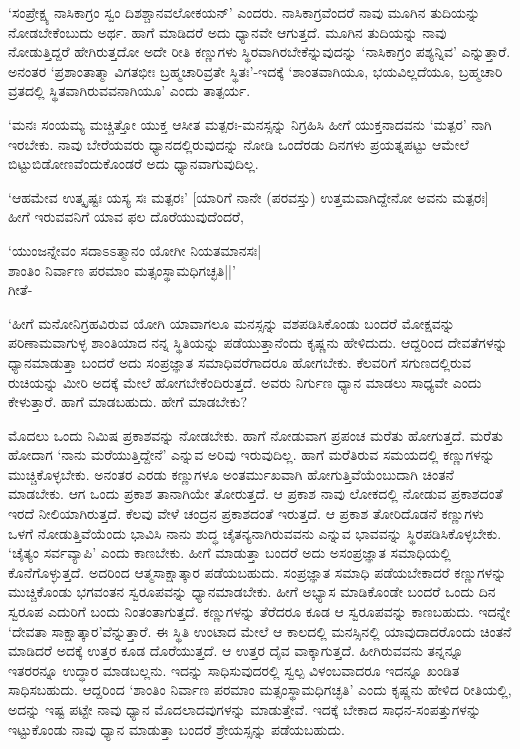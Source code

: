 `ಸಂಪ್ರೇಕ್ಷ್ಯ ನಾಸಿಕಾಗ್ರಂ ಸ್ವಂ ದಿಶಶ್ಚಾನವಲೋಕಯನ್' ಎಂದರು. ನಾಸಿಕಾಗ್ರವೆಂದರೆ ನಾವು ಮೂಗಿನ ತುದಿಯನ್ನು ನೋಡಬೇಕೆಂಬುದು ಅರ್ಥ. ಹಾಗೆ ಮಾಡಿದರೆ ಅದು ಧ್ಯಾನವೇ ಆಗುತ್ತದೆ. ಮೂಗಿನ ತುದಿಯನ್ನು ನಾವು ನೋಡುತ್ತಿದ್ದರೆ ಹೇಗಿರುತ್ತದೋ ಅದೇ ರೀತಿ ಕಣ್ಣುಗಳು ಸ್ಥಿರವಾಗಿರಬೇಕೆನ್ನುವುದನ್ನು `ನಾಸಿಕಾಗ್ರಂ ಪಶ್ಯನ್ನಿವ' ಎನ್ನುತ್ತಾರೆ. ಅನಂತರ `ಪ್ರಶಾಂತಾತ್ಮಾ ವಿಗತಭೀಃ ಬ್ರಹ್ಮಚಾರಿವ್ರತೇ ಸ್ಥಿತಃ'-ಇದಕ್ಕೆ `ಶಾಂತವಾಗಿಯೂ, ಭಯವಿಲ್ಲದೆಯೂ, ಬ್ರಹ್ಮಚಾರಿ ವ್ರತದಲ್ಲಿ ಸ್ಥಿತವಾಗಿರುವವನಾಗಿಯೂ' ಎಂದು ತಾತ್ಪರ್ಯ.

`ಮನಃ ಸಂಯಮ್ಯ ಮಚ್ಚಿತ್ತೋ ಯುಕ್ತ ಆಸೀತ ಮತ್ಪರಃ-ಮನಸ್ಸನ್ನು ನಿಗ್ರಹಿಸಿ ಹೀಗೆ ಯುಕ್ತನಾದವನು `ಮತ್ಪರ' ನಾಗಿ ಇರಬೇಕು. ನಾವು ಬೇರೆಯವರು ಧ್ಯಾನದಲ್ಲಿರುವುದನ್ನು ನೋಡಿ ಒಂದೆರಡು ದಿನಗಳು ಪ್ರಯತ್ನಪಟ್ಟು ಆಮೇಲೆ ಬಿಟ್ಟುಬಿಡೋಣವೆಂದುಕೊಂಡರೆ ಅದು ಧ್ಯಾನವಾಗುವುದಿಲ್ಲ.

`ಆಹಮೇವ ಉತ್ಕೃಷ್ಟಃ ಯಸ್ಯ ಸಃ ಮತ್ಪರಃ' [ಯಾರಿಗೆ ನಾನೇ (ಪರವಸ್ತು) ಉತ್ತಮವಾಗಿದ್ದೇನೋ ಅವನು ಮತ್ಪರಃ] ಹೀಗೆ ಇರುವವನಿಗೆ ಯಾವ ಫಲ ದೊರೆಯುವುದೆಂದರೆ,

\begin{shloka}
`ಯುಂಜನ್ನೇವಂ ಸದಾಽಽತ್ಮಾನಂ ಯೋಗೀ ನಿಯತಮಾನಸಃ|\\
ಶಾಂತಿಂ ನಿರ್ವಾಣ ಪರಮಾಂ ಮತ್ಸಂಸ್ಥಾಮಧಿಗಚ್ಛತಿ||'\\
\hfill{ಗೀತೆ-}
\end{shloka}

`ಹೀಗೆ ಮನೋನಿಗ್ರಹವಿರುವ ಯೋಗಿ ಯಾವಾಗಲೂ ಮನಸ್ಸನ್ನು ವಶಪಡಿಸಿಕೊಂಡು ಬಂದರೆ ಮೋಕ್ಷವನ್ನು ಪರಿಣಾಮವಾಗುಳ್ಳ ಶಾಂತಿಯಾದ ನನ್ನ ಸ್ಥಿತಿಯನ್ನು ಪಡೆಯುತ್ತಾನೆಂದು ಕೃಷ್ಣನು ಹೇಳಿದುದು. ಆದ್ದರಿಂದ ದೇವತೆಗಳನ್ನು ಧ್ಯಾನಮಾಡುತ್ತಾ ಬಂದರೆ ಅದು ಸಂಪ್ರಜ್ಞಾತ ಸಮಾಧಿವರೆಗಾದರೂ ಹೋಗಬೇಕು. ಕೆಲವರಿಗೆ ಸಗುಣದಲ್ಲಿರುವ ರುಚಿಯನ್ನು ಮೀರಿ ಅದಕ್ಕೆ ಮೇಲೆ ಹೋಗಬೇಕೆಂದಿರುತ್ತದೆ. ಅವರು ನಿರ್ಗುಣ ಧ್ಯಾನ ಮಾಡಲು ಸಾಧ್ಯವೇ ಎಂದು ಕೇಳುತ್ತಾರೆ. ಹಾಗೆ ಮಾಡಬಹುದು. ಹೇಗೆ ಮಾಡಬೇಕು?

ಮೊದಲು ಒಂದು ನಿಮಿಷ ಪ್ರಕಾಶವನ್ನು ನೋಡಬೇಕು. ಹಾಗೆ ನೋಡುವಾಗ ಪ್ರಪಂಚ ಮರೆತು ಹೋಗುತ್ತದೆ. ಮರೆತು ಹೋದಾಗ `ನಾನು ಮರೆಯುತ್ತಿದ್ದೇನೆ' ಎನ್ನುವ ಅರಿವು ಇರುವುದಿಲ್ಲ. ಹಾಗೆ ಮರೆತಿರುವ ಸಮಯದಲ್ಲಿ ಕಣ್ಣುಗಳನ್ನು ಮುಚ್ಚಿಕೊಳ್ಳಬೇಕು. ಅನಂತರ ಎರಡು ಕಣ್ಣುಗಳೂ ಅಂತರ್ಮುಖವಾಗಿ ಹೋಗುತ್ತಿವೆಯೆಂಬುದಾಗಿ ಚಿಂತನೆ ಮಾಡಬೇಕು. ಆಗ ಒಂದು ಪ್ರಕಾಶ ತಾನಾಗಿಯೇ ತೋರುತ್ತದೆ. ಆ ಪ್ರಕಾಶ ನಾವು ಲೋಕದಲ್ಲಿ ನೋಡುವ ಪ್ರಕಾಶದಂತೆ ಇರದೆ ನೀಲಿಯಾಗಿರುತ್ತದೆ. ಕೆಲವು ವೇಳೆ ಚಂದ್ರನ ಪ್ರಕಾಶದಂತೆ ಇರುತ್ತದೆ. ಆ ಪ್ರಕಾಶ ತೋರಿದೊಡನೆ ಕಣ್ಣುಗಳು ಒಳಗೆ ನೋಡುತ್ತಿವೆಯೆಂದು ಭಾವಿಸಿ ನಾನು ಶುದ್ಧ ಚೈತನ್ಯನಾಗಿರುವವನು ಎನ್ನುವ ಭಾವವನ್ನು ಸ್ಥಿರಪಡಿಸಿಕೊಳ್ಳಬೇಕು. `ಚೈತ್ಯಂ ಸರ್ವವ್ಯಾಪಿ' ಎಂದು ಕಾಣಬೇಕು. ಹೀಗೆ ಮಾಡುತ್ತಾ ಬಂದರೆ ಅದು ಅಸಂಪ್ರಜ್ಞಾತ ಸಮಾಧಿಯಲ್ಲಿ ಕೊನೆಗೊಳ್ಳುತ್ತದೆ. ಅದರಿಂದ ಆತ್ಮಸಾಕ್ಷಾತ್ಕಾರ ಪಡೆಯಬಹುದು. ಸಂಪ್ರಜ್ಞಾತ ಸಮಾಧಿ ಪಡೆಯಬೇಕಾದರೆ ಕಣ್ಣುಗಳನ್ನು ಮುಚ್ಚಿಕೊಂಡು ಭಗವಂತನ ಸ್ವರೂಪವನ್ನು ಧ್ಯಾನಮಾಡಬೇಕು. ಹೀಗೆ ಅಭ್ಯಾಸ ಮಾಡಿಕೊಂಡೇ ಬಂದರೆ ಒಂದು ದಿನ ಸ್ವರೂಪ ಎದುರಿಗೆ ಬಂದು ನಿಂತಂತಾಗುತ್ತದೆ. ಕಣ್ಣುಗಳನ್ನು ತೆರೆದರೂ ಕೂಡ ಆ ಸ್ವರೂಪವನ್ನು ಕಾಣಬಹುದು. ಇದನ್ನೇ `ದೇವತಾ ಸಾಕ್ಷಾತ್ಕಾರ'ವೆನ್ನುತ್ತಾರೆ. ಈ ಸ್ಥಿತಿ ಉಂಟಾದ ಮೇಲೆ ಆ ಕಾಲದಲ್ಲಿ ಮನಸ್ಸಿನಲ್ಲಿ ಯಾವುದಾದರೊಂದು ಚಿಂತನೆ ಮಾಡಿದರೆ ಅದಕ್ಕೆ ಉತ್ತರ ಕೂಡ ದೊರೆಯುತ್ತದೆ. ಆ ಉತ್ತರ ದೈವ ವಾಕ್ಕಾಗುತ್ತದೆ. ಹೀಗಿರುವವನು ತನ್ನನ್ನೂ ಇತರರನ್ನೂ ಉದ್ಧಾರ ಮಾಡಬಲ್ಲನು. ಇದನ್ನು ಸಾಧಿಸುವುದರಲ್ಲಿ ಸ್ವಲ್ಪ ವಿಳಂಬವಾದರೂ ಇದನ್ನೂ ಖಂಡಿತ ಸಾಧಿಸಬಹುದು. ಆದ್ದರಿಂದ `ಶಾಂತಿಂ ನಿರ್ವಾಣ ಪರಮಾಂ ಮತ್ಸಂಸ್ಥಾಮಧಿಗಚ್ಛತಿ' ಎಂದು ಕೃಷ್ಣನು ಹೇಳಿದ ರೀತಿಯಲ್ಲಿ, ಅದನ್ನು ಇಷ್ಟ ಪಟ್ಟೇ ನಾವು ಧ್ಯಾನ ಮೊದಲಾದವುಗಳನ್ನು ಮಾಡುತ್ತೇವೆ. ಇದಕ್ಕೆ ಬೇಕಾದ ಸಾಧನ-ಸಂಪತ್ತುಗಳನ್ನು ಇಟ್ಟುಕೊಂಡು ನಾವು ಧ್ಯಾನ ಮಾಡುತ್ತಾ ಬಂದರೆ ಶ್ರೇಯಸ್ಸನ್ನು ಪಡೆಯಬಹುದು.


